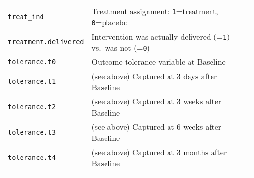\documentclass[]{article}
\begin{document}
\begin{longtable}[c]{@{}ll@{}}
\begin{minipage}[t]{0.34\columnwidth}
\texttt{treat\_ind}
\end{minipage} & \begin{minipage}[t]{0.59\columnwidth}\raggedright
Treatment assignment: \texttt{1}=treatment, \texttt{0}=placebo
\end{minipage}
\\\addlinespace
\begin{minipage}[t]{0.34\columnwidth}\raggedright
\texttt{treatment.delivered}
\end{minipage} & \begin{minipage}[t]{0.59\columnwidth}\raggedright
Intervention was actually delivered (=\texttt{1}) vs.~was not
(=\texttt{0})
\end{minipage}
\\\addlinespace
\begin{minipage}[t]{0.34\columnwidth}\raggedright
\texttt{tolerance.t0}
\end{minipage} & \begin{minipage}[t]{0.59\columnwidth}\raggedright
Outcome tolerance variable at Baseline
\end{minipage}
\\\addlinespace
\begin{minipage}[t]{0.34\columnwidth}\raggedright
\texttt{tolerance.t1}
\end{minipage} & \begin{minipage}[t]{0.59\columnwidth}\raggedright
(see above) Captured at 3 days after Baseline
\end{minipage}
\\\addlinespace
\begin{minipage}[t]{0.34\columnwidth}\raggedright
\texttt{tolerance.t2}
\end{minipage} & \begin{minipage}[t]{0.59\columnwidth}\raggedright
(see above) Captured at 3 weeks after Baseline
\end{minipage}
\\\addlinespace
\begin{minipage}[t]{0.34\columnwidth}\raggedright
\texttt{tolerance.t3}
\end{minipage} & \begin{minipage}[t]{0.59\columnwidth}\raggedright
(see above) Captured at 6 weeks after Baseline
\end{minipage}
\\\addlinespace
\begin{minipage}[t]{0.34\columnwidth}\raggedright
\texttt{tolerance.t4}
\end{minipage} & \begin{minipage}[t]{0.59\columnwidth}\raggedright
(see above) Captured at 3 months after Baseline
\end{minipage}
\\\addlinespace
\bottomrule
\end{longtable}
\end{document}
